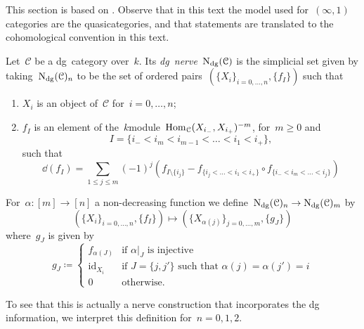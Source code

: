 \begin{refsection}
This section is based on \cite[section 1.3.1]{ha}. Observe that in this text the model used for~$(\infty,1)$\dash categories are the quasicategories, and that statements are translated to the cohomological convention in this text.

\begin{definition}
  \label{definition:dg-nerve}
  Let~$\mathcal{C}$ be a dg~category over~$k$. Its \emph{dg~nerve}~$\operatorname{N}_{\mathrm{dg}}(\mathcal{C})$ is the simplicial set given by taking~$\operatorname{N}_{\mathrm{dg}}(\mathcal{C})_n$ to be the set of ordered pairs~$(\{X_i\}_{i=0,\dotsc,n},\{f_I\})$ such that
  \begin{enumerate}
    \item $X_i$ is an object of~$\mathcal{C}$ for~$i=0,\dotsc,n$;
    \item $f_I$ is an element of the~$k$\dash module~$\mathrm{Hom}_{\mathcal{C}}(X_{i_-},X_{i_+})^{-m}$, for~$m\geq 0$ and
      \begin{equation}
        I=\{i_-<i_m<i_{m-1}<\dotso<i_1<i_+\},
      \end{equation}
      such that
      \begin{equation}
        \dd(f_I)=\sum_{1\leq j\leq m}(-1)^j\left( f_{I\setminus\{i_j\}}-f_{\{i_j<\dotso<i_1<i_+\}}\circ f_{\{i_-<i_m<\dotso<i_j\}} \right)
      \end{equation}
  \end{enumerate}
  For~$\alpha\colon[m]\to[n]$ a non-decreasing function we define~$\operatorname{N}_{\mathrm{dg}}(\mathcal{C})_n\to\operatorname{N}_{\mathrm{dg}}(\mathcal{C})_m$ by
  \begin{equation}
    \left( \{X_i\}_{i=0,\dotsc,n},\{f_I\} \right)\mapsto\left( \{X_{\alpha(j)}\}_{j=0,\dotsc,m},\{g_J\} \right)
  \end{equation}
  where~$g_J$ is given by
  \begin{equation}
    g_J\coloneqq
    \begin{cases}
      f_{\alpha(J)} & \text{if~$\alpha|_J$ is injective} \\
      \mathrm{id}_{X_i} & \text{if~$J=\{j,j'\}$ such that~$\alpha(j)=\alpha(j')=i$} \\
      0 & \text{otherwise}.
    \end{cases}
  \end{equation}
\end{definition}
To see that this is actually a nerve construction that incorporates the dg information, we interpret this definition for~$n=0,1,2$.
\begin{example} {\ }
  \label{example:low-degree-interpretation}
  \begin{itemize}

\end{itemize}
\end{example}
\end{refsection}
